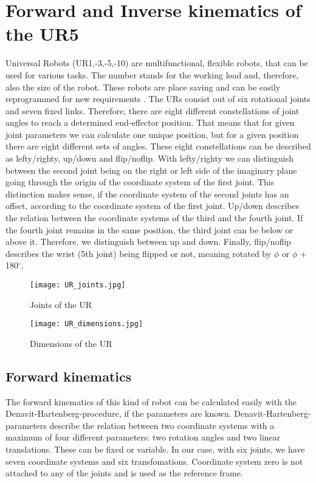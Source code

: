 \section{Forward and Inverse kinematics of the UR5}
Universal Robots (UR1,-3,-5,-10) are multifunctional, flexible robots, that can be used for various tasks. 
The number stands for the working load and, therefore, also the size of the robot. These robots 
are place saving and can be easily reprogrammed for new requirements \cite{ref:ur_vorteile}.
The URs consist out of six rotational joints and seven fixed links. Therefore, there are eight different constellations of joint angles to reach a determined end-effector position. That means that for given joint parameters we can calculate one unique position, but for a given position there are eight different sets of angles. These eight constellations can be described as lefty/righty, up/down and flip/noflip. With lefty/righty we can distinguish between the second joint being on the right or left
side of the imaginary plane going through the origin of the coordinate system of the first joint. This distinction makes sense, if the coordinate system of the second joints has an offset, according to the coordinate system of the first joint.  Up/down describes the relation between the coordinate systems of the third and the fourth joint. If the fourth joint remains in the same position, the third joint can 
be below or above it. Therefore, we distinguish between up and down. Finally, flip/noflip describes
the wrist (5th joint) being flipped or not, meaning rotated by $\phi$ or $\phi$ + 180$^\circ$. 

\begin{figure}[!b]	
\centering
		\texttt{[image: UR\_joints.jpg]}			
		\caption{Joints of the UR \cite{ref:ur_joints}}
		\label{fig:ur_joints}
\end{figure}
\begin{figure}[!b]
\centering
		\texttt{[image: UR\_dimensions.jpg]}	
		\caption{Dimensions of the UR \cite{ref:ur_dimensions}}		
		\label{fig:ur_dimensions}
\end{figure}


\subsection{Forward kinematics}
The forward kinematics of this kind of robot can be calculated easily with the Denavit-Hartenberg-procedure, if the parameters are known. Denavit-Hartenberg-parameters describe the relation between two coordinate systems with a maximum of four different parameters: two rotation angles 
and two linear translations. These can be fixed or variable. In our case, with six joints, we have seven coordinate systems and six transfomations. Coordinate system zero is not attached to any of the joints and is used as the reference frame. \\
